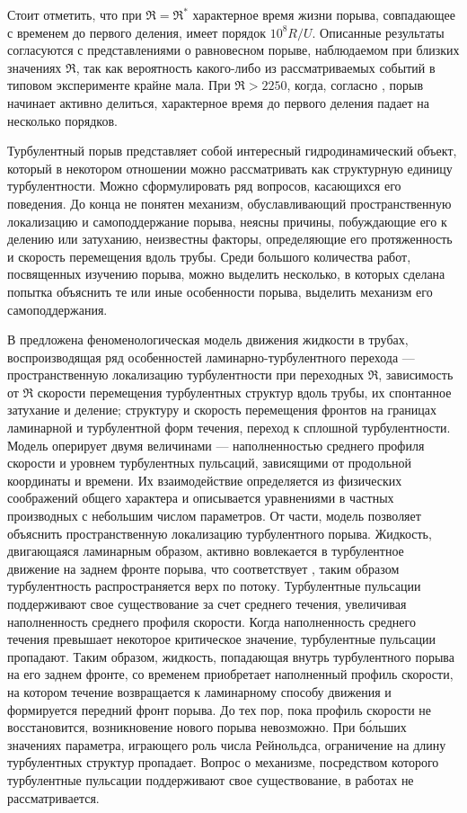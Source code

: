 Стоит отметить, что при $\Re = \Re^*$ характерное время жизни порыва, совпадающее с временем до первого деления, имеет порядок $10^8 R/U$. Описанные результаты согласуются с представлениями о равновесном порыве, наблюдаемом при близких значениях $\Re$, так как вероятность какого-либо из рассматриваемых событий в типовом эксперименте крайне мала. При $\Re > 2250$, когда, согласно \cite{Moxey2010}, порыв начинает активно делиться, характерное время до первого деления падает на несколько порядков. 

Турбулентный порыв представляет собой интересный гидродинамический объект, который в некотором отношении можно рассматривать как структурную единицу турбулентности. Можно сформулировать ряд вопросов, касающихся его поведения. До конца не понятен механизм, обуславливающий пространственную локализацию и самоподдержание порыва, неясны причины, побуждающие его к делению или затуханию, неизвестны факторы, определяющие его протяженность и скорость перемещения вдоль трубы. Среди большого количества работ, посвященных изучению порыва, можно выделить несколько, в которых сделана попытка объяснить те или иные особенности порыва, выделить механизм его самоподдержания.  

В \cite{Barkley2015, Barkley2016} предложена феноменологическая модель движения жидкости в трубах, воспроизводящая ряд особенностей ламинарно-турбулентного перехода --- пространственную локализацию турбулентности при переходных $\Re$, зависимость от $\Re$ скорости перемещения турбулентных структур вдоль трубы, их спонтанное затухание и деление; структуру и скорость перемещения фронтов на границах ламинарной и турбулентной форм течения, переход к сплошной турбулентности. Модель оперирует двумя величинами --- наполненностью среднего профиля скорости и уровнем турбулентных пульсаций, зависящими от продольной координаты и времени. Их взаимодействие определяется из физических соображений общего характера и описывается уравнениями в частных производных с небольшим числом параметров. От части, модель позволяет объяснить пространственную локализацию турбулентного порыва. Жидкость, двигающаяся ламинарным образом, активно вовлекается в турбулентное движение на заднем фронте порыва, что соответствует \cite{Song2017}, таким образом турбулентность распространяется верх по потоку. Турбулентные пульсации поддерживают свое существование за счет среднего течения, увеличивая наполненность среднего профиля скорости. Когда наполненность среднего течения превышает некоторое критическое значение, турбулентные пульсации пропадают. Таким образом, жидкость, попадающая внутрь турбулентного порыва на его заднем фронте, со временем приобретает наполненный профиль скорости, на котором течение возвращается к ламинарному способу движения и формируется передний фронт порыва. До тех пор, пока профиль скорости не восстановится, возникновение нового порыва невозможно. При б\'{о}льших значениях параметра, играющего роль числа Рейнольдса, ограничение на длину турбулентных структур пропадает. Вопрос о механизме, посредством которого турбулентные пульсации поддерживают свое существование, в работах \cite{Barkley2015, Barkley2016} не рассматривается.

